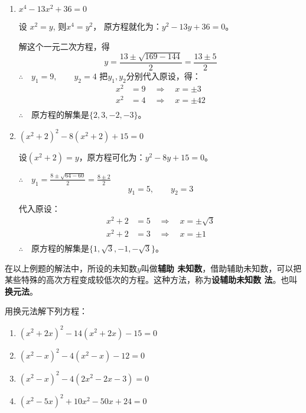 \begin{solution}
\begin{enumerate}
    \item $x^4-13x^2+36=0$

    设 $x^2=y$, 则$x^4=y^2$，
    原方程就化为：$y^2-13y+36=0$。

    解这个一元二次方程，得
\[y=\frac{13\pm \sqrt{169-144}}{2}=\frac{13\pm 5}{2}\]
$\therefore\quad y_1=9,\qquad y_2=4$
把$y_1,y_2$分别代入原设，得：
\begin{align*}
    x^2&=9 \quad \Rightarrow\quad  x=\pm 3\\
    x^2&=4 \quad \Rightarrow\quad  x=\pm 42\\
\end{align*}
$\therefore\quad $原方程的解集是$\{2,3,-2,-3\}$。

\item $(x^2+2)^2-8(x^2+2)+15=0$

设$(x^2+2)=y$，原方程可化为：$y^2-8y+15=0$。

$\therefore\quad y_1=\frac{8\pm\sqrt{64-60}}{2}=\frac{8\pm 2}{2}$
\[y_1=5,\qquad y_2=3\]

代入原设：
\begin{align*}
    x^2+2&=5 \quad \Rightarrow\quad  x=\pm\sqrt{3}\\
    x^2+2&=3 \quad \Rightarrow\quad  x=\pm 1\\
\end{align*}
$\therefore\quad $原方程的解集是$\{1,\sqrt{3},-1,-\sqrt{3}\}$。

\end{enumerate}    
\end{solution}

在以上例题的解法中，所设的未知数$y$叫做\textbf{辅助
未知数}，借助辅助未知数，可以把某些特殊的高次方程变成较低次的方程。这种方法，称为\textbf{设辅助未知数
法}。也叫\textbf{换元法}。

\begin{ex}
    用换元法解下列方程：
    
\begin{enumerate}
    \item $(x^2+2x)^2-14(x^2+2x)-15=0$
    \item $(x^2-x)^2-4(x^2-x)-12=0$
    \item $(x^2-x)^2-4(2x^2-2x-3)=0$
    \item $(x^2-5x)^2+10x^2-50x+24=0$
\end{enumerate}        
    

\end{ex}

